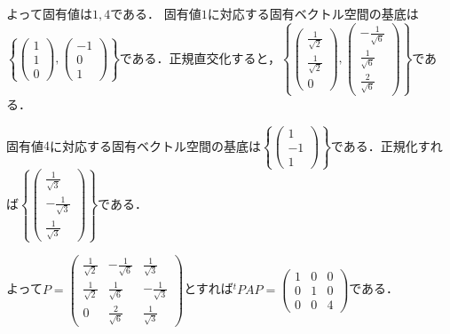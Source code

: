 \documentclass[
		book,
		head_space=20mm,
		foot_space=20mm,
		gutter=10mm,
		line_length=190mm
]{jlreq}
\begin{document}
よって固有値は$1,4$である．
固有値$1$に対応する固有ベクトル空間の基底は$\left\{ \begin{pmatrix}
1\\1\\0
\end{pmatrix},\begin{pmatrix}
-1\\0\\1
\end{pmatrix} \right\}$である．正規直交化すると，$\left\{ \begin{pmatrix}
\frac{1}{\sqrt{2}}\\\frac{1}{\sqrt{2}}\\0
\end{pmatrix},\begin{pmatrix}
-\frac{1}{\sqrt{6}}\\\frac{1}{\sqrt{6}}\\\frac{2}{\sqrt{6}}
\end{pmatrix} \right\}$である．

固有値$4$に対応する固有ベクトル空間の基底は$\left\{ \begin{pmatrix}
1\\-1\\1
\end{pmatrix} \right\}$である．正規化すれば$\left\{ \begin{pmatrix}
\frac{1}{\sqrt{3}}\\-\frac{1}{\sqrt{3}}\\\frac{1}{\sqrt{3}}
\end{pmatrix} \right\}$である．

よって$P=\begin{pmatrix}
\frac{1}{\sqrt{2}}&-\frac{1}{\sqrt{6}}&\frac{1}{\sqrt{3}}\\
\frac{1}{\sqrt{2}}&\frac{1}{\sqrt{6}}&-\frac{1}{\sqrt{3}}\\
0&\frac{2}{\sqrt{6}}&\frac{1}{\sqrt{3}}
\end{pmatrix}$とすれば$^t\!PAP=\begin{pmatrix}
1&0&0\\
0&1&0\\
0&0&4
\end{pmatrix}$である．
\end{document}
